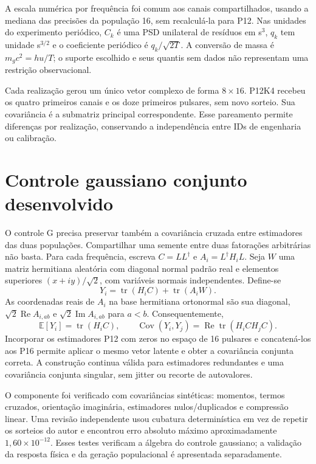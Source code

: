A escala numérica por frequência foi comum aos canais compartilhados, usando a mediana das precisões da população 16, sem recalculá-la para P12. Nas unidades do experimento periódico, $C_k$ é uma PSD unilateral de resíduos em s$^3$, $q_k$ tem unidade s$^{3/2}$ e o coeficiente periódico é $q_k/\sqrt{2T}$. A conversão de massa é $m_gc^2=hu/T$; o suporte escolhido e seus quantis sem dados não representam uma restrição observacional.

Cada realização gerou um único vetor complexo de forma $8\times16$. P12K4 recebeu os quatro primeiros canais e os doze primeiros pulsares, sem novo sorteio. Sua covariância é a submatriz principal correspondente. Esse pareamento permite diferenças por realização, conservando a independência entre IDs de engenharia ou calibração.

\section{Controle gaussiano conjunto desenvolvido}

O controle G precisa preservar também a covariância cruzada entre estimadores das duas populações. Compartilhar uma semente entre duas fatorações arbitrárias não basta. Para cada frequência, escreva $C=LL^\dagger$ e $A_i=L^\dagger H_iL$. Seja $W$ uma matriz hermitiana aleatória com diagonal normal padrão real e elementos superiores $(x+iy)/\sqrt2$, com variáveis normais independentes. Define-se
\begin{equation}
 Y_i=\operatorname{tr}(H_iC)+\operatorname{tr}(A_iW).
\end{equation}
As coordenadas reais de $A_i$ na base hermitiana ortonormal são sua diagonal, $\sqrt2\operatorname{Re}A_{i,ab}$ e $\sqrt2\operatorname{Im}A_{i,ab}$ para $a<b$. Consequentemente,
\begin{equation}
 \mathbb E[Y_i]=\operatorname{tr}(H_iC),\qquad
 \operatorname{Cov}(Y_i,Y_j)=\operatorname{Re}\operatorname{tr}(H_iCH_jC).
\end{equation}
Incorporar os estimadores P12 com zeros no espaço de 16 pulsares e concatená-los aos P16 permite aplicar o mesmo vetor latente e obter a covariância conjunta correta. A construção continua válida para estimadores redundantes e uma covariância conjunta singular, sem jitter ou recorte de autovalores.

O componente foi verificado com covariâncias sintéticas: momentos, termos cruzados, orientação imaginária, estimadores nulos/duplicados e compressão linear. Uma revisão independente usou cubatura determinística em vez de repetir os sorteios do autor e encontrou erro absoluto máximo aproximadamente $1{,}60\times10^{-12}$. Esses testes verificam a álgebra do controle gaussiano; a validação da resposta física e da geração populacional é apresentada separadamente.

